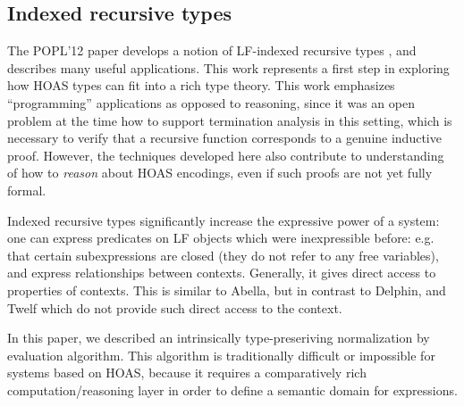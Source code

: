 \documentclass{article}
\begin{document}
\subsection{Indexed recursive types}
The POPL'12 paper develops a notion of LF-indexed recursive types
\citep{Cave12}, and describes many useful applications. This work represents a
first step in exploring how HOAS types can fit
into a rich type theory. This work emphasizes ``programming'' applications
as opposed to reasoning, since it was an open problem at the time how
to support termination analysis in this setting, which is necessary to
verify that a recursive function corresponds to a genuine inductive proof. However, the techniques
developed here also contribute to understanding of how to \emph{reason} about
HOAS encodings, even if such proofs are not yet fully formal.

Indexed recursive types significantly increase the expressive power of a system: one can express
predicates on LF objects which were inexpressible before: e.g. that
certain subexpressions are closed (they do not refer to any free variables), and express relationships between
contexts. Generally, it gives direct access to properties of
contexts. This is similar to Abella, but in contrast to Delphin, and Twelf which do not
provide such direct access to the context.

In this paper, we described an intrinsically type-preseriving
normalization by evaluation algorithm. This algorithm is traditionally
difficult or impossible for systems based on HOAS, because it requires
a comparatively rich computation/reasoning layer in order to define a semantic domain for expressions.
\end{document}
